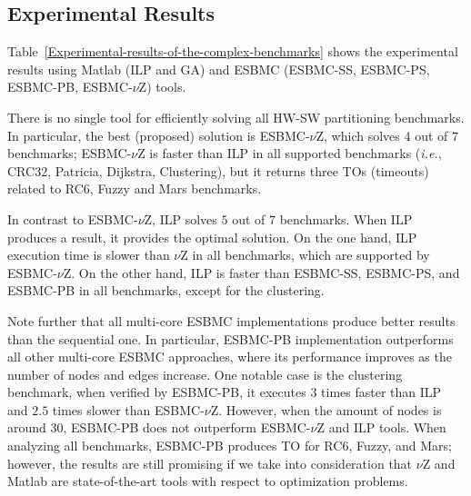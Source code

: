 \documentclass{doublecol-new}
\theoremstyle{TH}{
\newtheorem{lemma}{Lemma}
\newtheorem{theorem}[lemma]{Theorem}
\newtheorem{corrolary}[lemma]{Corrolary}
\newtheorem{conjecture}[lemma]{Conjecture}
\newtheorem{proposition}[lemma]{Proposition}
\newtheorem{claim}[lemma]{Claim}
\newtheorem{stheorem}[lemma]{Wrong Theorem}
\newtheorem{algorithm}{Algorithm}
}
\theoremstyle{THrm}{
\newtheorem{definition}{Definition}[section]
\newtheorem{question}{Question}[section]
\newtheorem{remark}{Remark}
\newtheorem{scheme}{Scheme}
}
\theoremstyle{THhit}{
\newtheorem{case}{Case}[section]
}
\begin{document}
\subsection{Experimental Results}
\label{Experimental-Results}

Table~\ref{Experimental-results-of-the-complex-benchmarks} shows the experimental results using Matlab (ILP and GA) and ESBMC (ESBMC-SS, ESBMC-PS, ESBMC-PB, ESBMC-$\nu$Z) tools.

There is no single tool for efficiently solving all HW-SW partitioning benchmarks. In particular, the best (proposed) solution is ESBMC-$\nu$Z, which solves $4$ out of $7$ benchmarks; ESBMC-$\nu$Z is faster than ILP in all supported benchmarks ({\it i.e.}, CRC$32$, Patricia, Dijkstra, Clustering), but it returns three TOs (timeouts) related to RC6, Fuzzy and Mars benchmarks.

In contrast to ESBMC-$\nu$Z, ILP solves $5$ out of $7$ benchmarks. When ILP produces a result, it provides the optimal solution. On the one hand, ILP execution time is slower than $\nu$Z in all benchmarks, which are supported by ESBMC-$\nu$Z. On the other hand, ILP is faster than ESBMC-SS, ESBMC-PS, and ESBMC-PB in all benchmarks, except for the clustering.

Note further that all multi-core ESBMC implementations produce better results than the sequential one. In particular, ESBMC-PB implementation outperforms all other multi-core ESBMC approaches, where its performance improves as the number of nodes and edges increase. One notable case is the clustering benchmark, when verified by ESBMC-PB, it executes $3$ times faster than ILP and $2$.$5$ times slower than ESBMC-$\nu$Z. However, when the amount of nodes is around $30$, ESBMC-PB does not outperform ESBMC-$\nu$Z and ILP tools. When analyzing all benchmarks, ESBMC-PB produces TO for RC$6$, Fuzzy, and Mars; however, the results are still promising if we take into consideration that $\nu$Z and Matlab are state-of-the-art tools with respect to optimization problems.
\end{document}

